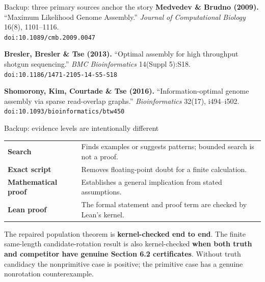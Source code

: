\documentclass[aspectratio=169]{beamer}
\begin{document}
\begin{frame}{Backup: three primary sources anchor the story}
\small
\textbf{Medvedev \& Brudno (2009).} ``Maximum Likelihood Genome Assembly.'' \emph{Journal of Computational Biology} 16(8), 1101--1116.\\
\texttt{doi:10.1089/cmb.2009.0047}\par\medskip

\textbf{Bresler, Bresler \& Tse (2013).} ``Optimal assembly for high throughput shotgun sequencing.'' \emph{BMC Bioinformatics} 14(Suppl 5):S18.\\
\texttt{doi:10.1186/1471-2105-14-S5-S18}\par\medskip

\textbf{Shomorony, Kim, Courtade \& Tse (2016).} ``Information-optimal genome assembly via sparse read-overlap graphs.'' \emph{Bioinformatics} 32(17), i494--i502.\\
\texttt{doi:10.1093/bioinformatics/btw450}
\end{frame}

\begin{frame}{Backup: evidence levels are intentionally different}
\begin{tabular}{p{}p{}}
\textbf{Search} & Finds examples or suggests patterns; bounded search is not a proof.\\[.7em]
\textbf{Exact script} & Removes floating-point doubt for a finite calculation.\\[.7em]
\textbf{Mathematical proof} & Establishes a general implication from stated assumptions.\\[.7em]
\textbf{Lean proof} & The formal statement and proof term are checked by Lean's kernel.\\
\end{tabular}
\vfill
\small The repaired population theorem is \textbf{kernel-checked end to end}.
The finite same-length candidate-rotation result is also kernel-checked
\textbf{when both truth and competitor have genuine Section 6.2 certificates}.
Without truth candidacy the nonprimitive case is positive; the primitive case
has a genuine nonrotation counterexample.
\end{frame}
\end{document}
